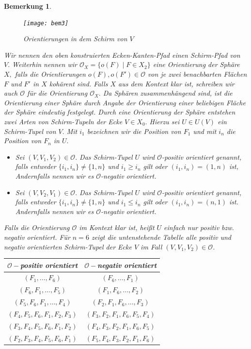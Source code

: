 \documentclass[12pt,titlepage,twoside,cleardoublepage]{article}
\theoremstyle{nummermitklammern}
\newtheorem{bemerkung}[temp]{Bemerkung}
\newtheorem{bemerkung}[zahl]{Bemerkung}
\numberwithin{equation}{section}
\begin{document}
\begin{bemerkung}
\begin{figure}[H]
\begin{center}
\texttt{[image: bem3]}
\end{center}
\caption{Orientierungen in dem Schirm von $V$}
\end{figure}
Wir nennen den oben konstruierten Ecken-Kanten-Pfad einen \emph{Schirm-Pfad} von $V.$
Weiterhin nennen wir $\mathcal{O}_X=\{o(F)\mid F\in X_2\}$ eine Orientierung der Sphäre $X,$ falls die Orientierungen $o(F),o(F')\in \mathcal{O}$ von je zwei benachbarten Flächen $F$ und $F'$ in $X$ kohärent sind. Falls $X$ aus dem Kontext klar ist, schreiben wir auch $\mathcal{O}$ für die Orientierung $\mathcal{O}_X.$ Da Sphären zusammenhängend sind, ist die  Orientierung einer Sphäre durch Angabe der Orientierung einer beliebigen Fläche der Sphäre eindeutig festgelegt. Durch eine Orientierung der Sphäre  entstehen zwei Arten von Schirm-Tupeln der Ecke $V\in X_0.$ Hierzu sei $U\in U(V)$ ein Schirm-Tupel von $V.$ Mit $i_1$ bezeichnen wir die Position von $F_1$ und mit $i_n$ die Position von $F_n$ in $U.$
\begin{itemize}
\item Sei
$(V,V_1,V_2)\in \mathcal{O}.$ Das Schirm-Tupel $U$ wird $\mathcal{O}$-\emph{positiv orientiert} genannt, falls entweder $\{i_1,i_n\}\neq\{1,n\}$ und $i_1\geq i_n$ gilt oder $(i_1,i_n)=(1,n)$ ist,  Andernfalls nennen wir es $\mathcal{O}$-\emph{negativ orientiert}.
\item Sei $(V,V_2,V_1)\in \mathcal{O}.$ Das Schirm-Tupel $U$ wird $\mathcal{O}$-\emph{positiv orientiert} genannt, falls entweder $\{i_1,i_n\}\neq \{1,n\}$ und $i_1\leq i_n$ gilt oder $(i_1,i_n)=(n,1)$ ist. Andernfalls nennen wir es $\mathcal{O}$-\emph{negativ orientiert}.
 \end{itemize}
Falls die Orientierung $\mathcal{O}$ im Kontext klar ist, heißt $U$ einfach nur positiv bzw. negativ orientiert.
Für $n=6$ zeigt die untenstehende Tabelle alle positiv und negativ orientierten Schirm-Tupel der Ecke $V$ im Fall $(V,V_1,V_2) \in \mathcal{O}$.\\
\begin{center}
\begin{tabular}{|c|c|}
\hline
$\mathcal{O}-$positiv orientiert & $\mathcal{O}-$negativ orientiert\\
\hline
$(F_1,\ldots,F_6)$&$(F_6,\ldots ,F_1)$\\
$(F_6,F_1,\ldots,F_5)$&$(F_1,F_6,\ldots ,F_2)$\\
$(F_5,F_6,F_1,\ldots,F_4)$&$(F_2,F_1,F_6,\ldots,F_3)$\\
$(F_4,F_5,F_6,F_1,F_2,F_3)$&$(F_3,F_2,F_1,F_6,F_5,F_4)$\\
$(F_3,F_4,F_5,F_6,F_1,F_2)$&$(F_4,F_3,F_2,F_1,F_6,F_5)$\\
$(F_2,F_3,F_4,F_5,F_6,F_1)$&$(F_5,F_4,F_3,F_2,F_1,F_6)$\\
\hline
\end{tabular}
\end{center}
\end{bemerkung}
  
\end{document}
